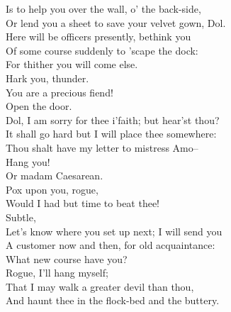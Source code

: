 \documentclass{memoir}
\begin{document}
\begin{drama*}
 Is to help you over the wall, o' the back-side,\\
 Or lend you a sheet to save your velvet gown, Dol.\\
 Here will be officers presently, bethink you\\
 Of some course suddenly to 'scape the dock:\\
 For thither you will come else.\\
 Hark you, thunder.\\
\subtlespeaks {} You are a precious fiend!\\
\officeronespeaks {} Open the door.\\
\facespeaks  Dol, I am sorry for thee i'faith; but hear'st thou?\\
 It shall go hard but I will place thee somewhere:\\
 Thou shalt have my letter to mistress Amo--\\
\dolspeaks  Hang you!\\
\facespeaks {} Or madam Caesarean.\\
\dolspeaks {} Pox upon you, rogue,\\
 Would I had but time to beat thee!\\
\facespeaks {} Subtle,\\
 Let's know where you set up next; I will send you\\
 A customer now and then, for old acquaintance:\\
 What new course have you?\\
\subtlespeaks {} Rogue, I'll hang myself;\\
 That I may walk a greater devil than thou,\\
 And haunt thee in the flock-bed and the buttery.\\
\scene


\end{drama*}
\end{document}
